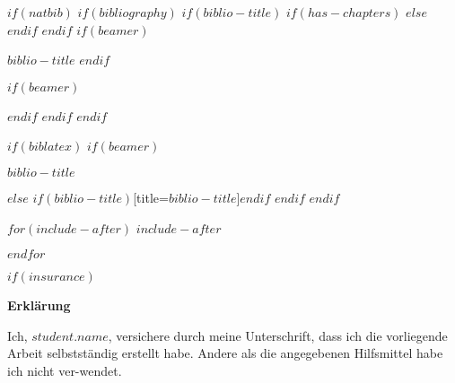 \documentclass[
    12pt,
    a4paper,
    $if(lang)$
        $babel-lang$,
    $endif$
    bibliography=totocnumbered,
    listof=totocnumbered
]{scrartcl}
\def \studentname{$student.firstname$ $student.lastname$}
\def \studentname{$student.name$}
\begin{document}
$if(natbib)$
    $if(bibliography)$
        $if(biblio-title)$
            $if(has-chapters)$
\renewcommand\bibname{$biblio-title$}
            $else$
\renewcommand\refname{$biblio-title$}
            $endif$
        $endif$
        $if(beamer)$
\begin{frame}[allowframebreaks]{$biblio-title$}
  \bibliographytrue
        $endif$
  
        $if(beamer)$
\end{frame}
        $endif$
    $endif$
$endif$

$if(biblatex)$
    $if(beamer)$
\begin{frame}[allowframebreaks]{$biblio-title$}
  \bibliographytrue
  \printbibliography[heading=none]
\end{frame}
    $else$
\printbibliography$if(biblio-title)$[title=$biblio-title$]$endif$
    $endif$
$endif$

$for(include-after)$
$include-after$

$endfor$




%	


$if(insurance)$
\newpage
\thispagestyle{empty}
\begin{center}
	\vspace*{5em}
	\huge\textbf{Erklärung}\\
\end{center}
\vspace{2em}
Ich, \studentname,  versichere  durch  meine  Unterschrift,  dass  ich  die  vorliegende Arbeit selbstständig erstellt habe. Andere als die angegebenen Hilfsmittel habe ich nicht ver-wendet. 
\end{document}
